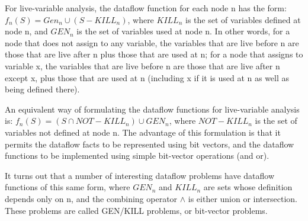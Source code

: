 For live-variable analysis, the dataflow function for each node n has the form: 
\(f_n(S) = Gen_n \cup (S - KILL_n)\), where \(KILL_n\) is the set of variables defined at node n, 
and \(GEN_n\) is the set of variables used at node n. In other words, for a node that does not 
assign to any variable, the variables that are live before n are those that are live after 
n plus those that are used at n; for a node that assigns to variable x, the variables that are 
live before n are those that are live after n except x, plus those that are used at n 
(including x if it is used at n as well as being defined there).

An equivalent way of formulating the dataflow functions for live-variable analysis is: 
\(f_n(S) = (S \cap NOT-KILL_n) \cup GEN_n\), where \(NOT-KILL_n\) is the set of variables not defined
 at node n. The advantage of this formulation is that it permits the dataflow facts to be 
 represented using bit vectors, and the dataflow functions to be implemented using simple 
 bit-vector operations (and or).

It turns out that a number of interesting dataflow problems have dataflow functions of this 
same form, where \(GEN_n\) and \(KILL_n\) are sets whose definition depends only on n, and the combining 
operator \(\wedge\) is either union or intersection. These problems are called GEN/KILL problems, 
or bit-vector problems.








